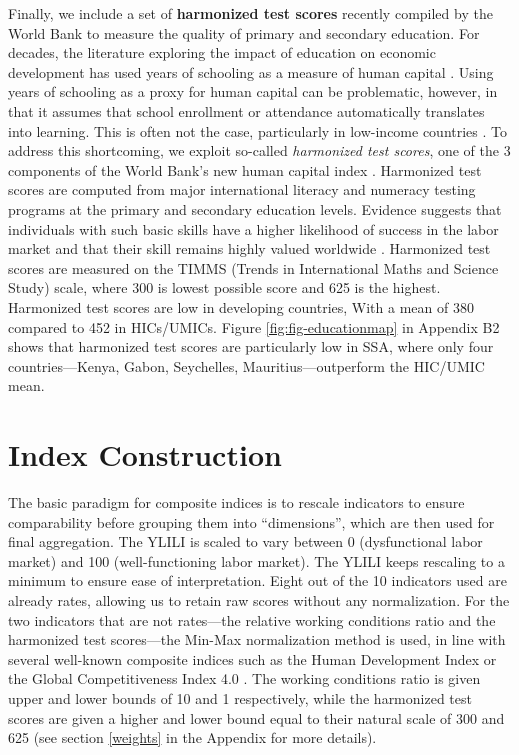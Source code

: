 \documentclass[
  a4paper, twoside, 12pt]{book}
\begin{document}
Finally, we include a set of \textbf{harmonized test scores} recently compiled by the World Bank to measure the quality of primary and secondary education. For decades, the literature exploring the impact of education on economic development has used years of schooling as a measure of human capital \autocites[e.g.][]{barro1991}[among others]{mankiw1992}. Using years of schooling as a proxy for human capital can be problematic, however, in that it assumes that school enrollment or attendance automatically translates into learning. This is often not the case, particularly in low-income countries \autocite{worldbank2018}. To address this shortcoming, we exploit so-called \emph{harmonized test scores}, one of the 3 components of the World Bank's new human capital index \autocite{angrist2019,kraay2018}. Harmonized test scores are computed from major international literacy and numeracy testing programs at the primary and secondary education levels. Evidence suggests that individuals with such basic skills have a higher likelihood of success in the labor market and that their skill remains highly valued worldwide \autocite{vignoles2020}. Harmonized test scores are measured on the TIMMS (Trends in International Maths and Science Study) scale, where 300 is lowest possible score and 625 is the highest. Harmonized test scores are low in developing countries, With a mean of 380 compared to 452 in HICs/UMICs. Figure \ref{fig:fig-educationmap} in Appendix B2 shows that harmonized test scores are particularly low in SSA, where only four countries---Kenya, Gabon, Seychelles, Mauritius---outperform the HIC/UMIC mean.

\hypertarget{methods}{%
\section{Index Construction}\label{methods}}

The basic paradigm for composite indices is to rescale indicators to ensure comparability before grouping them into ``dimensions'', which are then used for final aggregation. The YLILI is scaled to vary between 0 (dysfunctional labor market) and 100 (well-functioning labor market). The YLILI keeps rescaling to a minimum to ensure ease of interpretation. Eight out of the 10 indicators used are already rates, allowing us to retain raw scores without any normalization. For the two indicators that are not rates---the relative working conditions ratio and the harmonized test scores---the Min-Max normalization method is used, in line with several well-known composite indices such as the Human Development Index or the Global Competitiveness Index 4.0 \autocite{decancq2013,oecd2008}. The working conditions ratio is given upper and lower bounds of 10 and 1 respectively, while the harmonized test scores are given a higher and lower bound equal to their natural scale of 300 and 625 (see section \ref{weights} in the Appendix for more details).
\end{document}
